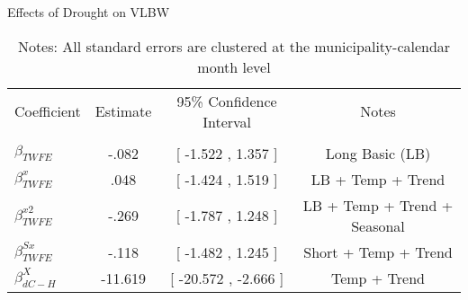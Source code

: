 \begin{table}[!ht]
\centering
\caption{Effects of Drought on VLBW}\label{tab:twfe_vlbw_test}
\renewcommand{\arraystretch}{1.5}
\fontsize{10pt}{12pt}\selectfont
\begin{tabular}{lccc}
\toprule
 \multicolumn{1}{c}{Coefficient}  &\multicolumn{1}{c}{Estimate}&\multicolumn{1}{c}{95\% Confidence Interval}&\multicolumn{1}{c}{Notes}\\\cmidrule(lr){2-2}\cmidrule(lr){3-3}\cmidrule(lr){4-4} \\
\midrule
 $ \beta_{TWFE} $ & -.082  & [ -1.522 ,  1.357 ] & Long Basic (LB) \\
 $ \beta^{x}_{TWFE} $ & .048  &  [ -1.424 ,  1.519  ] & LB + Temp + Trend \\
 $ \beta^{x2}_{TWFE} $ & -.269  & [ -1.787 ,  1.248  ] & LB + Temp + Trend + Seasonal \\
 $ \beta^{Sx}_{TWFE} $ & -.118  & [ -1.482 ,  1.245  ] & Short + Temp + Trend \\
 $ \beta^{X}_{dC-H} $ & -11.619  & [ -20.572 ,  -2.666 ] & Temp + Trend \\
\bottomrule
\end{tabular}
\caption*{\footnotesize{Notes: All standard errors are clustered at the municipality-calendar month level}}
\end{table}
